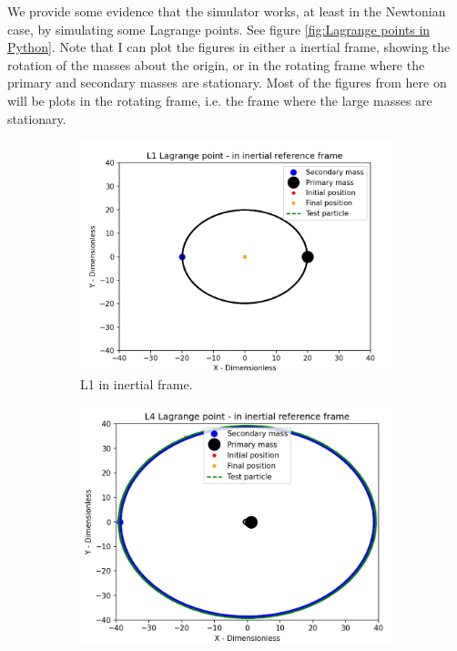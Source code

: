 \documentclass{article}
\begin{document}
We provide some evidence that the simulator works, at least in the Newtonian case, by simulating some Lagrange points. See figure \ref{fig:Lagrange points in Python}. Note that I can plot the figures in either a inertial frame, showing the rotation of the masses about the origin, or in the rotating frame where the primary and secondary masses are stationary. Most of the figures from here on will be plots in the rotating frame, i.e. the frame where the large masses are stationary.

\begin{figure}
    \centering
     \begin{subfigure}[b]{0.3\textwidth}
         \centering
         \includegraphics[width=\textwidth]{images/L1 in inertial frame.png}
         \caption{L1 in inertial frame.}
         \label{fig:L1 in inertial frame}
     \end{subfigure}
     \begin{subfigure}[b]{0.3\textwidth}
         \centering
         \includegraphics[width=\textwidth]{images/L4 Lagrange point in inertial frame.png}

\end{subfigure}
\end{figure}
\end{document}
